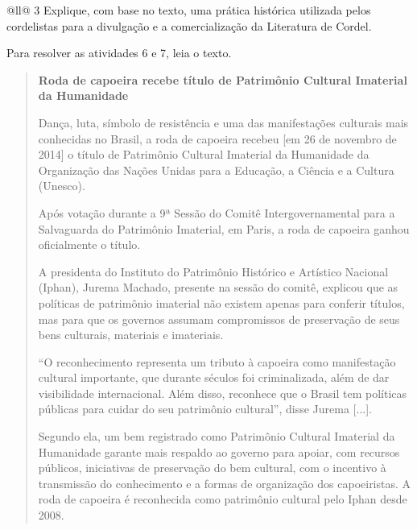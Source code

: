 \begin{itemize}
\begin{itemize}
\begin{escolha}[]{@{}ll@{}}
\num{3} Explique, com base no texto, uma prática histórica utilizada
  pelos cordelistas para a divulgação e a comercialização da Literatura
  de Cordel.


Para resolver as atividades 6 e 7, leia o texto.

\begin{quote}
\textbf{Roda de capoeira recebe título de Patrimônio Cultural Imaterial da Humanidade}

Dança, luta, símbolo de resistência e uma das manifestações culturais mais 
conhecidas no Brasil, a roda de capoeira recebeu [em 26 de novembro de 2014] 
o título de Patrimônio Cultural Imaterial da Humanidade da Organização das 
Nações Unidas para a Educação, a Ciência e a Cultura (Unesco).

Após votação durante a 9ª Sessão do Comitê Intergovernamental para a Salvaguarda 
do Patrimônio Imaterial, em Paris, a roda de capoeira ganhou oficialmente o título.

A presidenta do Instituto do Patrimônio Histórico e Artístico Nacional (Iphan), 
Jurema Machado, presente na sessão do comitê, explicou que as políticas de patrimônio 
imaterial não existem apenas para conferir títulos, mas para que os governos 
assumam compromissos de preservação de seus bens culturais, materiais e imateriais.

``O reconhecimento representa um tributo à capoeira como manifestação cultural 
importante, que durante séculos foi criminalizada, além de dar visibilidade 
internacional. Além disso, reconhece que o Brasil tem políticas públicas para cuidar 
do seu patrimônio cultural'', disse Jurema {[}...{]}.

Segundo ela, um bem registrado como Patrimônio Cultural Imaterial da Humanidade 
garante mais respaldo ao governo para apoiar, com recursos públicos, iniciativas 
de preservação do bem cultural, com o incentivo à transmissão do conhecimento e a 
formas de organização dos capoeiristas. A roda de capoeira é reconhecida como 
patrimônio cultural pelo Iphan desde 2008.


\end{quote}
\end{escolha}
\end{itemize}
\end{itemize}
